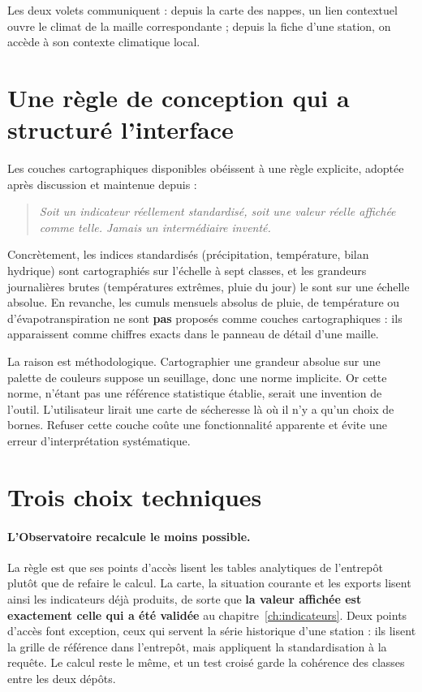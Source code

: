 Les deux volets communiquent : depuis la carte des nappes, un lien contextuel ouvre le climat de
la maille correspondante ; depuis la fiche d'une station, on accède à son contexte climatique
local.

\section{Une règle de conception qui a structuré l'interface}

Les couches cartographiques disponibles obéissent à une règle explicite, adoptée après
discussion et maintenue depuis :

\begin{quote}
\emph{Soit un indicateur réellement standardisé, soit une valeur réelle affichée comme telle.
Jamais un intermédiaire inventé.}
\end{quote}

Concrètement, les indices standardisés (précipitation, température, bilan hydrique) sont
cartographiés sur l'échelle à sept classes, et les grandeurs journalières brutes (températures
extrêmes, pluie du jour) le sont sur une échelle absolue. En revanche, les cumuls mensuels
absolus de pluie, de température ou d'évapotranspiration ne sont \textbf{pas} proposés comme
couches cartographiques : ils apparaissent comme chiffres exacts dans le panneau de détail d'une
maille.

La raison est méthodologique. Cartographier une grandeur absolue sur une palette de couleurs
suppose un seuillage, donc une norme implicite. Or cette norme, n'étant pas une référence
statistique établie, serait une invention de l'outil. L'utilisateur lirait une carte de
sécheresse là où il n'y a qu'un choix de bornes. Refuser cette couche coûte une fonctionnalité
apparente et évite une erreur d'interprétation systématique.

\section{Trois choix techniques}

\paragraph{L'Observatoire recalcule le moins possible.} La règle est que ses points d'accès
lisent les tables analytiques de l'entrepôt plutôt que de refaire le calcul. La carte, la
situation courante et les exports lisent ainsi les indicateurs déjà produits, de sorte que
\textbf{la valeur affichée est exactement celle qui a été validée} au
chapitre~\ref{ch:indicateurs}. Deux points d'accès font exception, ceux qui servent la série
historique d'une station : ils lisent la grille de référence dans l'entrepôt, mais appliquent la
standardisation à la requête. Le calcul reste le même, et un test croisé garde la cohérence des
classes entre les deux dépôts.

